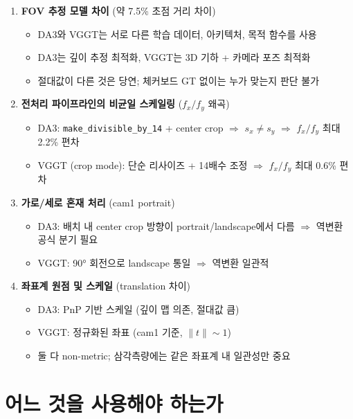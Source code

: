 \documentclass[11pt, a4paper]{report}
\begin{document}
\begin{enumerate}[leftmargin=*]
  \item \textbf{FOV 추정 모델 차이} (약 7.5\% 초점 거리 차이)
    \begin{itemize}
      \item DA3와 VGGT는 서로 다른 학습 데이터, 아키텍처, 목적 함수를 사용
      \item DA3는 깊이 추정 최적화, VGGT는 3D 기하 + 카메라 포즈 최적화
      \item 절대값이 다른 것은 당연; 체커보드 GT 없이는 누가 맞는지 판단 불가
    \end{itemize}

  \item \textbf{전처리 파이프라인의 비균일 스케일링} ($f_x/f_y$ 왜곡)
    \begin{itemize}
      \item DA3: \texttt{make\_divisible\_by\_14} + center crop $\Rightarrow$ $s_x \neq s_y$ $\Rightarrow$ $f_x/f_y$ 최대 2.2\% 편차
      \item VGGT (crop mode): 단순 리사이즈 + 14배수 조정 $\Rightarrow$ $f_x/f_y$ 최대 0.6\% 편차
    \end{itemize}

  \item \textbf{가로/세로 혼재 처리} (cam1 portrait)
    \begin{itemize}
      \item DA3: 배치 내 center crop 방향이 portrait/landscape에서 다름 $\Rightarrow$ 역변환 공식 분기 필요
      \item VGGT: 90° 회전으로 landscape 통일 $\Rightarrow$ 역변환 일관적
    \end{itemize}

  \item \textbf{좌표계 원점 및 스케일} (translation 차이)
    \begin{itemize}
      \item DA3: PnP 기반 스케일 (깊이 맵 의존, 절대값 큼)
      \item VGGT: 정규화된 좌표 (cam1 기준, $\|t\| \sim 1$)
      \item 둘 다 non-metric; 삼각측량에는 같은 좌표계 내 일관성만 중요
    \end{itemize}
\end{enumerate}


\section{어느 것을 사용해야 하는가}
\end{document}
